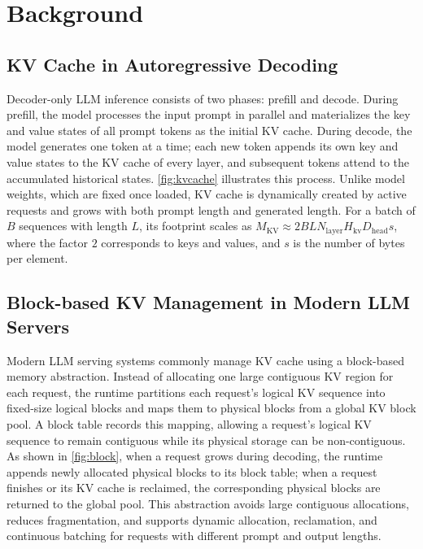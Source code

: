 \documentclass[sigplan,10pt,review,anonymous]{acmart}
\begin{document}
\section{Background}
\label{background}

\subsection{KV Cache in Autoregressive Decoding}

Decoder-only LLM inference consists of two phases: prefill and decode.
During prefill, the model processes the input prompt in parallel and materializes the key and value states of all prompt tokens as the initial KV cache.
During decode, the model generates one token at a time; each new token appends its own key and value states to the KV cache of every layer, and subsequent tokens attend to the accumulated historical states.
\autoref{fig:kvcache} illustrates this process.
Unlike model weights, which are fixed once loaded, KV cache is dynamically created by active requests and grows with both prompt length and generated length.
For a batch of $B$ sequences with length $L$, its footprint scales as
$M_{\mathrm{KV}} \approx 2BLN_{\mathrm{layer}}H_{\mathrm{kv}}D_{\mathrm{head}}s$,
where the factor $2$ corresponds to keys and values, and $s$ is the number of bytes per element.

\subsection{Block-based KV Management in Modern LLM Servers}

Modern LLM serving systems commonly manage KV cache using a block-based memory abstraction.
Instead of allocating one large contiguous KV region for each request, the runtime partitions each request's logical KV sequence into fixed-size logical blocks and maps them to physical blocks from a global KV block pool.
A block table records this mapping, allowing a request's logical KV sequence to remain contiguous while its physical storage can be non-contiguous.
As shown in \autoref{fig:block}, when a request grows during decoding, the runtime appends newly allocated physical blocks to its block table; when a request finishes or its KV cache is reclaimed, the corresponding physical blocks are returned to the global pool.
This abstraction avoids large contiguous allocations, reduces fragmentation, and supports dynamic allocation, reclamation, and continuous batching for requests with different prompt and output lengths.
\end{document}
